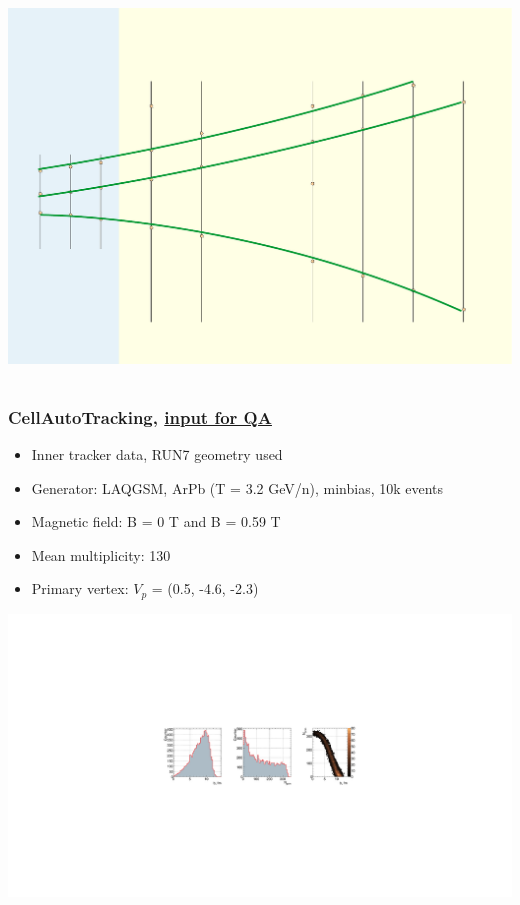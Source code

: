 \documentclass[dvipsnames, aspectratio=43] {beamer}
\begin{document}
\begin{frame}
\begin{columns}[t]
\begin{block}{\bf {}}
      \includegraphics[width=1.\linewidth]{TrackingScheme_track_refit.pdf}
    \end{block}
  \end{columns}
\end{frame}

\begin{frame}
  \bf
  \frametitle{\bf \centering CellAutoTracking, \underline{input for QA}}
  \begin{block}{}
    \begin{itemize}
      \item Inner tracker data, RUN7 geometry used
      \item Generator: LAQGSM, ArPb (T = 3.2 GeV/n), minbias, 10k events
      \item Magnetic field: B = 0 T and B = 0.59 T
      \item Mean multiplicity: 130
      \item Primary vertex: $V_{p}$ = (0.5, -4.6, -2.3)
    \end{itemize}
  \end{block}
  \begin{block}{}
    \includegraphics[width=1.\linewidth]{qa_input.pdf}
  \end{block}
\end{frame}
\end{document}
